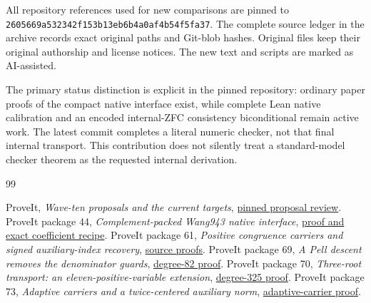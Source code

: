 \documentclass[11pt]{article}
\theoremstyle{definition}
\theoremstyle{remark}
\newcommand{\pin}{\texttt{2605669a532342f153b13eb6b4a0af4b54f5fa37}}
\begin{document}
All repository references used for new comparisons are pinned to
\pin. The complete source ledger in the archive records exact original
paths and Git-blob hashes. Original files keep their original authorship
and license notices. The new text and scripts are marked as AI-assisted.

The primary status distinction is explicit in the pinned repository:
ordinary paper proofs of the compact native interface exist, while complete
Lean native calibration and an encoded internal-ZFC consistency biconditional
remain active work. The latest commit completes a literal numeric checker,
not that final internal transport. This contribution does not silently treat
a standard-model checker theorem as the requested internal derivation.

\begin{thebibliography}{99}
\raggedright
{} ProveIt, \emph{Wave-ten proposals and the current targets},
\href{https://github.com/VladimirReshetnikov/ProveIt/blob/2605669a532342f153b13eb6b4a0af4b54f5fa37/Computability/DiophantineConsistency/PROPOSAL_REVIEW_WAVE10.md}{pinned proposal review}.
 ProveIt package 44, \emph{Complement-packed Wang943 native interface},
\href{https://github.com/VladimirReshetnikov/ProveIt/blob/2605669a532342f153b13eb6b4a0af4b54f5fa37/Computability/DiophantineConsistency/con-zfc-diophantine-forms/44-b4-sparse/native/PROOF.md}{proof and exact coefficient recipe}.
 ProveIt package 61, \emph{Positive congruence carriers and signed auxiliary-index recovery},
\href{https://github.com/VladimirReshetnikov/ProveIt/tree/2605669a532342f153b13eb6b4a0af4b54f5fa37/Computability/DiophantineConsistency/con-zfc-diophantine-forms/61-congruence-carriers/positive}{source proofs}.
 ProveIt package 69, \emph{A Pell descent removes the denominator guards},
\href{https://github.com/VladimirReshetnikov/ProveIt/blob/2605669a532342f153b13eb6b4a0af4b54f5fa37/Computability/DiophantineConsistency/con-zfc-diophantine-forms/69-cones-pell/positive/PROOF.md}{degree-82 proof}.
 ProveIt package 70, \emph{Three-root transport: an eleven-positive-variable extension},
\href{https://github.com/VladimirReshetnikov/ProveIt/blob/2605669a532342f153b13eb6b4a0af4b54f5fa37/Computability/DiophantineConsistency/con-zfc-diophantine-forms/70-residue-orientation/eleven/PROOF.md}{degree-325 proof}.
 ProveIt package 73, \emph{Adaptive carriers and a twice-centered auxiliary norm},
\href{https://github.com/VladimirReshetnikov/ProveIt/blob/2605669a532342f153b13eb6b4a0af4b54f5fa37/Computability/DiophantineConsistency/con-zfc-diophantine-forms/73-guard-reanchoring/positive/PROOF.md}{adaptive-carrier proof}.

\end{thebibliography}
\end{document}

